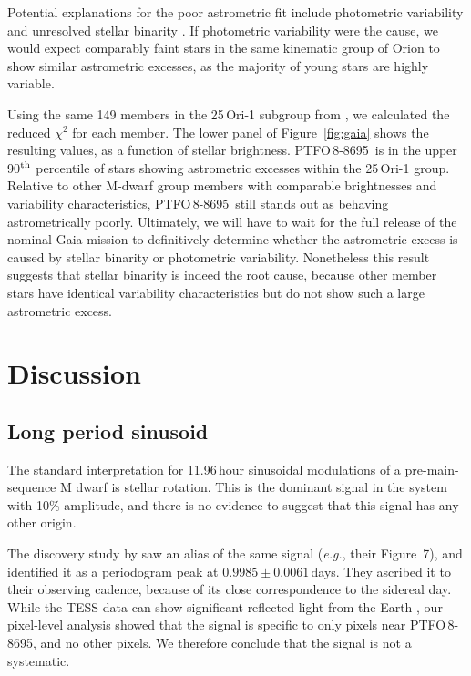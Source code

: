 \documentclass[12pt,twocolumn,tighten]{aastex62}
\newcommand{\ptfo}{PTFO$\,$8-8695}
\begin{document}
Potential explanations for the poor astrometric fit include photometric
variability and unresolved stellar binarity \citep[{\it
e.g.},][]{rizzuto_ZEIT8_2018,belokurov_unresolved_2020}.
If photometric variability were the cause, we would expect comparably
faint stars in the same kinematic group of Orion to
show similar astrometric excesses, as the majority of
young stars are highly variable.

Using the same 149 members in the 25$\,$Ori-1 subgroup from
\citet{kounkel_apogee2_2018}, we calculated the reduced $\chi^2$ for
each member.  The lower panel of Figure~\ref{fig:gaia} shows the
resulting values, as a function of stellar brightness.  \ptfo\ is in
the upper 90$^{\rm th}$ percentile of stars showing astrometric
excesses within the 25$\,$Ori-1 group.  
Relative to other M-dwarf group members with comparable
brightnesses and variability characteristics, \ptfo\ still stands out
as behaving astrometrically poorly.
Ultimately, we will have to wait
for the full release of the nominal Gaia mission to definitively
determine whether the astrometric excess is caused by stellar binarity
or photometric variability.
Nonetheless this result suggests that stellar binarity
is indeed the root cause, because other member stars have identical variability
characteristics but do not show such a large astrometric excess.



\section{Discussion}
\label{sec:discussion}

\subsection{Long period sinusoid}

The standard interpretation for 11.96$\,$hour sinusoidal modulations of a
pre-main-sequence M dwarf is stellar rotation.  This is the dominant signal in the system with
10\% amplitude, and there is no evidence to suggest that this signal
has any other origin.

The discovery study by \citet{van_eyken_ptf_2012} saw an alias of the same signal
({\it e.g.}, their Figure~7), and identified it as a
periodogram peak at $0.9985 \pm 0.0061\,$days. They ascribed it to
their observing cadence, because of its close correspondence to the
sidereal day.  While the TESS data can show significant reflected
light from the Earth \citep[{\it e.g.},][]{luger_tess_2019}, our
pixel-level analysis showed that the signal is specific to only pixels
near \ptfo, and no other pixels.  We therefore conclude that the
signal is not a systematic.
\end{document}

